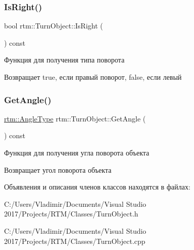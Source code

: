 \subsubsection{\texorpdfstring{Is\+Right()}{IsRight()}}
{\footnotesize\ttfamily bool rtm\+::\+Turn\+Object\+::\+Is\+Right (\begin{DoxyParamCaption}{ }\end{DoxyParamCaption}) const}

Функция для получения типа поворота \begin{DoxyReturn}{Возвращает}
true, если правый поворот, false, если левый 
\end{DoxyReturn}
\mbox{\label{classrtm_1_1_turn_object_ae3fbfdd8e940bbb61d3a68db236d60b5}} 
\subsubsection{\texorpdfstring{Get\+Angle()}{GetAngle()}}
{\footnotesize\ttfamily \hyperlink{namespacertm_a69dc82b16a0148c10962caa83d930f89}{rtm\+::\+Angle\+Type} rtm\+::\+Turn\+Object\+::\+Get\+Angle (\begin{DoxyParamCaption}{ }\end{DoxyParamCaption}) const}

Функция для получения угла поворота объекта \begin{DoxyReturn}{Возвращает}
угол поворота объекта 
\end{DoxyReturn}


Объявления и описания членов классов находятся в файлах\+:\begin{DoxyCompactItemize}
\item 
C\+:/\+Users/\+Vladimir/\+Documents/\+Visual Studio 2017/\+Projects/\+R\+T\+M/\+Classes/Turn\+Object.\+h\item 
C\+:/\+Users/\+Vladimir/\+Documents/\+Visual Studio 2017/\+Projects/\+R\+T\+M/\+Classes/Turn\+Object.\+cpp\end{DoxyCompactItemize}
